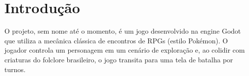 \section{Introdução}
	O projeto, sem nome até o momento, é um jogo desenvolvido na engine Godot que utiliza a mecânica clássica de encontros de RPGs (estilo Pokémon). O jogador controla um personagem em um cenário de exploração e, ao colidir com criaturas do folclore brasileiro, o jogo transita para uma tela de batalha por turnos.
\label{sec:introducao}

	
